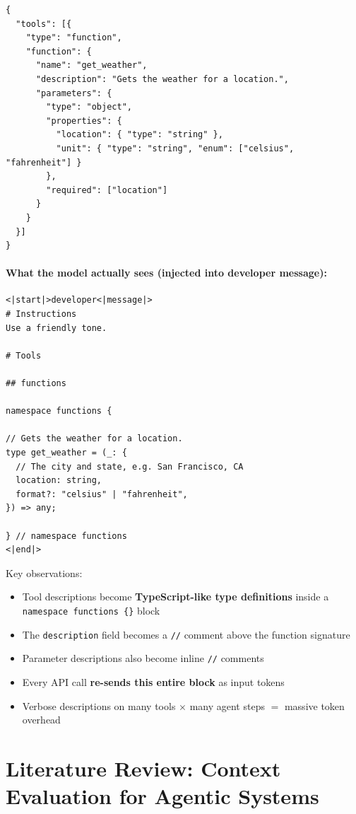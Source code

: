 \begin{verbatim}
{
  "tools": [{
    "type": "function",
    "function": {
      "name": "get_weather",
      "description": "Gets the weather for a location.",
      "parameters": {
        "type": "object",
        "properties": {
          "location": { "type": "string" },
          "unit": { "type": "string", "enum": ["celsius", "fahrenheit"] }
        },
        "required": ["location"]
      }
    }
  }]
}
\end{verbatim}

\paragraph{What the model actually sees (injected into developer message):}

\begin{verbatim}
<|start|>developer<|message|>
# Instructions
Use a friendly tone.

# Tools

## functions

namespace functions {

// Gets the weather for a location.
type get_weather = (_: {
  // The city and state, e.g. San Francisco, CA
  location: string,
  format?: "celsius" | "fahrenheit",
}) => any;

} // namespace functions
<|end|>
\end{verbatim}

\noindent Key observations:
\begin{itemize}
    \item Tool descriptions become \textbf{TypeScript-like type definitions} inside a \texttt{namespace functions \{\}} block
    \item The \texttt{description} field becomes a \texttt{//} comment above the function signature
    \item Parameter descriptions also become inline \texttt{//} comments
    \item Every API call \textbf{re-sends this entire block} as input tokens
    \item Verbose descriptions on many tools $\times$ many agent steps $=$ massive token overhead
\end{itemize}


\newpage
\section{Literature Review: Context Evaluation for Agentic Systems}

